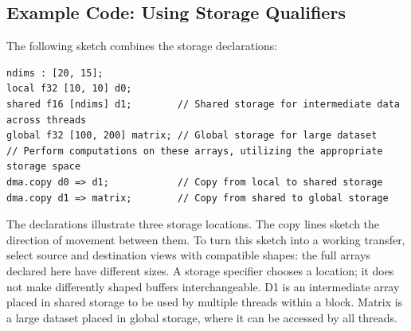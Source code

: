 \subsection*{Example Code: Using Storage Qualifiers}

The following sketch combines the storage declarations:

\begin{lstlisting}[language=croqtile,caption={Example Code: Using Storage Qualifiers}]
ndims : [20, 15];
local f32 [10, 10] d0;
shared f16 [ndims] d1;        // Shared storage for intermediate data across threads
global f32 [100, 200] matrix; // Global storage for large dataset
// Perform computations on these arrays, utilizing the appropriate storage space
dma.copy d0 => d1;            // Copy from local to shared storage
dma.copy d1 => matrix;        // Copy from shared to global storage
\end{lstlisting}

The declarations illustrate three storage locations. The copy lines sketch the direction of movement between them. To turn this sketch into a working transfer, select source and destination views with compatible shapes: the full arrays declared here have different sizes. A storage specifier chooses a location; it does not make differently shaped buffers interchangeable.
D1 is an intermediate array placed in shared storage to be used by multiple threads within a block. Matrix is a large dataset placed in global storage, where it can be accessed by all threads.
